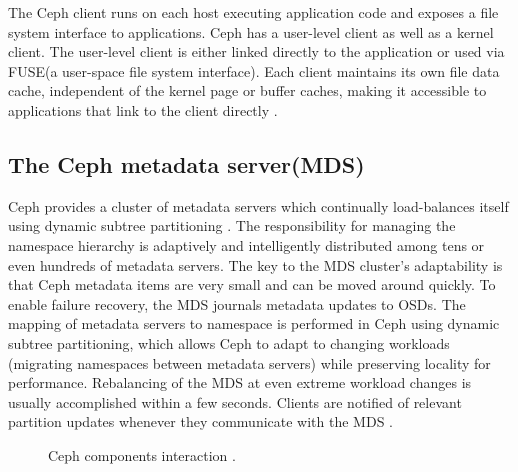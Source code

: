 \documentclass[9pt,twocolumn,twoside]{styles/osajnl}
\begin{document}
The Ceph client runs on each host executing application code and
exposes a file system interface to applications. Ceph has a user-level
client as well as a kernel client. The user-level client is either
linked directly to the application or used via FUSE(a user-space file
system interface). Each client maintains its own file data cache,
independent of the kernel page or buffer caches, making it accessible
to applications that link to the client directly \cite{paper-Ceph}.
\subsection{The Ceph metadata server(MDS)}
Ceph provides a cluster of metadata servers which continually
load-balances itself using dynamic subtree partitioning
\cite{ceph-metadata}. The responsibility for managing the namespace
hierarchy is adaptively and intelligently distributed among tens or
even hundreds of metadata servers. The key to the MDS cluster’s
adaptability is that Ceph metadata items are very small and can be
moved around quickly. To enable failure recovery, the MDS journals
metadata updates to OSDs. The mapping of metadata servers to namespace
is performed in Ceph using dynamic subtree partitioning, which allows
Ceph to adapt to changing workloads (migrating namespaces between
metadata servers) while preserving locality for
performance. Rebalancing of the MDS at even extreme workload changes
is usually accomplished within a few seconds. Clients are notified of
relevant partition updates whenever they communicate with the MDS
\cite{www-ibm-ceph}.

\begin{figure}[htbp]
\centering
{}
\caption{Ceph components interaction \cite{paper-ceph-hadoop}.}
\label{CCI}
\end{figure}
\end{document}
